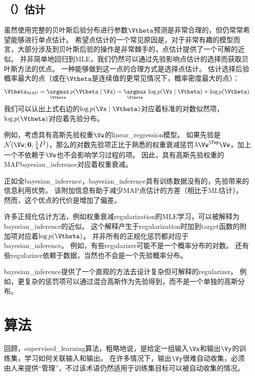 \subsection{（）估计}
\label{sec:maximum_a_posteriori_map_estimation}
虽然使用完整的贝叶斯后验分布进行参数$\Vtheta$预测是非常合理的，但仍常常希望能够进行单点估计。
希望点估计的一个常见原因是，对于非常有趣的模型而言，大部分涉及到贝叶斯后验的操作是非常棘手的，点估计提供了一个可解的近似。
并非简单地回归到\gls{MLE}，我们仍然可以通过先验影响点估计的选择而获取贝叶斯方法的优点。
一种能够做到这一点的合理方式是选择点估计。
估计选择后验概率最大的点（或在$\Vtheta$是连续值的更常见情况下，概率密度最大的点）：
\begin{equation}
\label{eq:5.79}
    \Vtheta_{\text{MAP}} = \underset{\Vtheta}{\argmax} \, p(\Vtheta\mid\Vx)
    = \underset{\Vtheta}{\argmax} \, \log p(\Vx \mid \Vtheta) + \log p(\Vtheta) .
\end{equation}
我们可以认出上式右边的$\log p(\Vx \mid \Vtheta)$对应着标准的对数似然项，$\log p(\Vtheta)$对应着先验分布。


例如，考虑具有高斯先验权重$\Vw$的\gls{linear_regression}模型。
如果先验是$\mathcal{N}(\Vw;\mathbf{0},\frac{1}{\lambda}I^2)$，那么的对数先验项正比于熟悉的权重衰减惩罚$\lambda \Vw^\Tsp\Vw$，加上一个不依赖于$\Vw$也不会影响学习过程的项。
因此，具有高斯先验权重的\gls{MAP}\gls{bayesian_inference}对应着权重衰减。

正如全\gls{bayesian_inference}，\gls{bayesian_inference}具有训练数据没有的，先验带来的信息利用优势。
该附加信息有助于减少\gls{MAP}点估计的方差（相比于ML估计）。
然而，这个优点的代价是增加了偏差。

许多正规化估计方法，例如权重衰减\gls{regularization}的\gls{MLE}学习，可以被解释为\gls{bayesian_inference}的近似。
这个解释产生于\gls{regularization}时加到\gls{target}函数的附加项对应着$\log p(\Vtheta)$。
并非所有的正规化惩罚都对应于\gls{bayesian_inference}。
例如，有些\gls{regularizer}可能不是一个概率分布的对数。
还有些\gls{regularizer}依赖于数据，当然也不会是一个先验概率分布。

\gls{bayesian_inference}提供了一个直观的方法去设计复杂但可解释的\gls{regularizer}。
例如，更复杂的惩罚项可以通过混合高斯作为先验得到，而不是一个单独的高斯分布\citep{Nowlan-nips92}。

\section{算法}
\label{sec:supervised_learning_algorithms}
回顾，\gls{supervised_learning}算法，粗略地说，是给定一组输入$\Vx$和输出$\Vy$的训练集，学习如何关联输入和输出。
在许多情况下，输出$\Vy$很难自动收集，必须由人来提供``管理''，不过该术语仍然适用于训练集目标可以被自动收集的情况。

